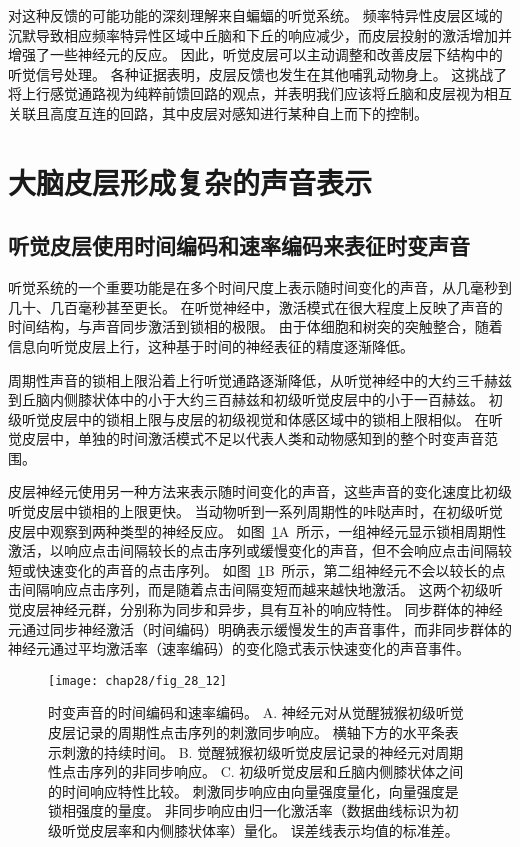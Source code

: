对这种反馈的可能功能的深刻理解来自蝙蝠的听觉系统。
频率特异性皮层区域的沉默导致相应频率特异性区域中丘脑和下丘的响应减少，而皮层投射的激活增加并增强了一些神经元的反应。
因此，听觉皮层可以主动调整和改善皮层下结构中的听觉信号处理。
各种证据表明，皮层反馈也发生在其他哺乳动物身上。
这挑战了将上行感觉通路视为纯粹前馈回路的观点，并表明我们应该将丘脑和皮层视为相互关联且高度互连的回路，其中皮层对感知进行某种自上而下的控制。



\section{大脑皮层形成复杂的声音表示}


\subsection{听觉皮层使用时间编码和速率编码来表征时变声音}

听觉系统的一个重要功能是在多个时间尺度上表示随时间变化的声音，从几毫秒到几十、几百毫秒甚至更长。
在听觉神经中，激活模式在很大程度上反映了声音的时间结构，与声音同步激活到锁相的极限。
由于体细胞和树突的突触整合，随着信息向听觉皮层上行，这种基于时间的神经表征的精度逐渐降低。


周期性声音的锁相上限沿着上行听觉通路逐渐降低，从听觉神经中的大约三千赫兹到丘脑内侧膝状体中的小于大约三百赫兹和初级听觉皮层中的小于一百赫兹。
初级听觉皮层中的锁相上限与皮层的初级视觉和体感区域中的锁相上限相似。
在听觉皮层中，单独的时间激活模式不足以代表人类和动物感知到的整个时变声音范围。


皮层神经元使用另一种方法来表示随时间变化的声音，这些声音的变化速度比初级听觉皮层中锁相的上限更快。
当动物听到一系列周期性的咔哒声时，在初级听觉皮层中观察到两种类型的神经反应。
如图~\ref{fig:28_12}A~所示，一组神经元显示锁相周期性激活，以响应点击间隔较长的点击序列或缓慢变化的声音，但不会响应点击间隔较短或快速变化的声音的点击序列。
如图~\ref{fig:28_12}B~所示，第二组神经元不会以较长的点击间隔响应点击序列，而是随着点击间隔变短而越来越快地激活。
这两个初级听觉皮层神经元群，分别称为同步和异步，具有互补的响应特性。
同步群体的神经元通过同步神经激活（时间编码）明确表示缓慢发生的声音事件，而非同步群体的神经元通过平均激活率（速率编码）的变化隐式表示快速变化的声音事件。


\begin{figure}[htbp]
	\centering
	\texttt{[image: chap28/fig\_28\_12]}
	\caption{时变声音的时间编码和速率编码。
	A. 神经元对从觉醒狨猴初级听觉皮层记录的周期性点击序列的刺激同步响应。
	横轴下方的水平条表示刺激的持续时间\cite{lu2001temporal}。
	B. 觉醒狨猴初级听觉皮层记录的神经元对周期性点击序列的非同步响应\cite{lu2001temporal}。
	C. 初级听觉皮层和丘脑内侧膝状体之间的时间响应特性比较。
	刺激同步响应由向量强度量化，向量强度是锁相强度的量度。
	非同步响应由归一化激活率（数据曲线标识为初级听觉皮层率和内侧膝状体率）量化。
	误差线表示均值的标准差\cite{bartlett2007neural}。}
	\label{fig:28_12}
\end{figure}



